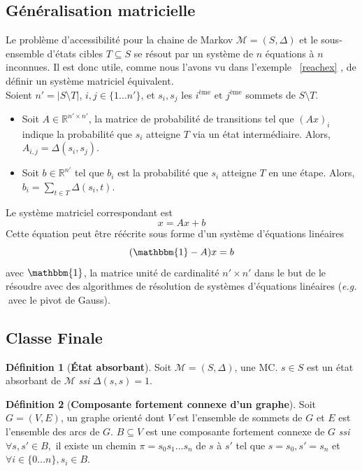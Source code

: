 \documentclass[12pt,a4paper]{report}
\theoremstyle{definition}
\newtheorem{definition}{Définition}[chapter]
\theoremstyle{remark}
\newcommand{\eg}{\textit{e.g.} }
\newcommand{\ssi}{\textit{ssi} }
\let\labelitemi\labelitemii
\begin{document}
\subsection{Généralisation matricielle}
Le problème d'accessibilité pour la chaine de Markov $\mathcal{M} = (S, \Delta)$ et le sous-ensemble d'états cibles $T \subseteq S$ se résout par un système de $n$ équations à $n$ inconnues. Il est donc utile, comme nous l'avons vu dans l'exemple ~\ref{reachex} , de définir un système matriciel équivalent. \\
Soient $n' = |S \setminus T|$, $i, j \in \{1 \dots n'\}$, et $s_i, s_j$ les $i^{\text{ème}} \text{ et } j^{\text{ème}} $ sommets de $S \setminus T$. 
\begin{itemize}
\renewcommand{\labelitemi}{\tiny$\bullet$}
\item Soit $A \in \mathbb{R}^{n' \times n'}$, la matrice de probabilité de transitions tel que $(Ax)_{i}$ indique la probabilité que $s_i$ atteigne $T$ via un état intermédiaire. Alors, $A_{i,j} = \Delta(s_i, s_j)$.
\item Soit $b \in \mathbb{R}^{n'}$ tel que $b_{i}$ est la probabilité que $s_i$ atteigne $T$ en une étape. Alors, $b_i = \sum_{t \in T} \Delta(s_i, t)$.
\end{itemize}
Le système matriciel correspondant est
\[ x = Ax + b \]
Cette équation peut être réécrite sous forme d'un système d'équations linéaires
\[ (\mathbbm{1} - A) x = b \]
avec $\mathbbm{1}$, la matrice unité de cardinalité $n' \times n'$ dans le but de le résoudre avec des algorithmes de résolution de systèmes d'équations linéaires (\eg $\;$avec le pivot de Gauss).

\subsection{Classe Finale}
\begin{definition}[\textbf{\'Etat absorbant}]
	Soit $\mathcal{M} = (S, \Delta)$, une MC. $s \in S$ est un état absorbant de $\mathcal{M}$ \ssi $\Delta(s, s) = 1$.
\end{definition}

\begin{definition}[\textbf{Composante fortement connexe d'un graphe}]
	Soit $G=(V, E)$, un graphe orienté dont $V$ est l'ensemble de sommets de $G$ et $E$ est l'ensemble des arcs de $G$. $B \subseteq V$ est une composante fortement connexe de $G$ \ssi $\forall s,s' \in B,$ il existe un chemin $\pi = s_0 s_1 \dots s_n$ de $s$ à $s'$ tel que $s = s_0 , s' = s_n$ et $\forall i \in \{0 \dots n\}, s_i \in B$.
\end{definition}
\end{document}
